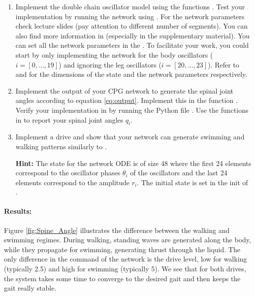 \documentclass{cmc}
\begin{document}
\begin{enumerate}
\item Implement the double chain oscillator model using the functions
  . Test your implementation by running the
  network using . For the network parameters check
  lecture slides (pay attention to different number of segments). You can also
  find more information in \cite{ijspeert2007swimming} (especially in the
  supplementary material). You can set all the network parameters in the
  . To facilitate your work, you
  could start by only implementing the network for the body oscillators
  ($i=[0, ..., 19]$) and ignoring the leg oscillators ($i=[20, ..., 23]$). Refer
  to  and
  \- for the dimensions of
  the state and the network parameters respectively.

\item Implement the output of your CPG network to generate the spinal joint
  angles according to equation \ref{eq:output}. Implement this in the function
  . Verify your implementation in by running
  the Python file .  Use the functions in
   to report your spinal joint angles $q_i$.

\item Implement a drive and show that your network can generate swimming and
  walking patterns similarly to \cite{ijspeert2007swimming}.

  \textbf{Hint:} The state for the network ODE is of size 48 where the first 24
  elements correspond to the oscillator phases $\theta_i$ of the oscillators and
  the last 24 elements correspond to the amplitude $r_i$. The initial state is
  set in the init of .
\end{enumerate}

\paragraph{Results:}
Figure \ref{fig:Spine_Angle} illustrates the difference between the walking and swimming regimes. During walking, standing waves are generated along the body, while they propagate for swimming, generating thrust through the liquid. The only difference in the command of the network is the drive level, low for walking (typically 2.5) and high for swimming (typically 5). We see that for both drives, the system takes some time to converge to the desired gait and then keeps the gait really stable. 
\end{document}
